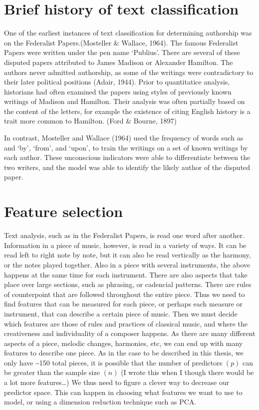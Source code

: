 \documentclass[12pt,twoside]{reedthesis}
\theoremstyle{definition}
\theoremstyle{definition}
\theoremstyle{definition}
\theoremstyle{remark}
\begin{document}
\section{Brief history of text
classification}\label{brief-history-of-text-classification}

One of the earliest instances of text classification for determining
authorship was on the Federalist Papers.(Mosteller \& Wallace, 1964).
The famous Federalist Papers were written under the pen name `Publius'.
There are several of these disputed papers attributed to James Madison
or Alexander Hamilton. The authors never admitted authorship, as some of
the writings were contradictory to their later political positions
(Adair, 1944). Prior to quantitatice analysis, historians had often
examined the papers using styles of previously known writings of Madison
and Hamilton. Their analysis was often partially based on the content of
the letters, for example the existence of citing English history is a
trait more common to Hamilton. (Ford \& Bourne, 1897)

In contrast, Mosteller and Wallace (1964) used the frequency of words
such as and `by', `from', and `upon', to train the writings on a set of
known writings by each author. These unconscious indicators were able to
differentiate between the two writers, and the model was able to
identify the likely author of the disputed paper.

\section{Feature selection}\label{feature-selection}

Text analysis, such as in the Federalist Papers, is read one word after
another. Information in a piece of music, however, is read in a variety
of ways. It can be read left to right note by note, but it can also be
read vertically as the harmony, or the notes played together. Also in a
piece with several instruments, the above happens at the same time for
each instrument. There are also aspects that take place over large
sections, such as phrasing, or cadencial patterns. There are rules of
counterpoint that are followed throughout the entire piece. Thus we need
to find features that can be measured for each piece, or perhaps each
measure or instrument, that can describe a certain piece of music. Then
we must decide which features are those of rules and practices of
classical music, and where the creativeness and individuality of a
composer happens. As there are many different aspects of a piece,
melodic changes, harmonies, etc, we can end up with many features to
describe one piece. As in the case to be described in this thesis, we
only have \textasciitilde{}150 total pieces, it is possible that the
number of predictors \((p)\) can be greater than the sample size \((n)\)
(I wrote this when I though there would be a lot more features\ldots{})
We thus need to figure a clever way to decrease our predictor space.
This can happen in choosing what features we want to use to model, or
using a dimension reduction technique such as PCA.
\end{document}
